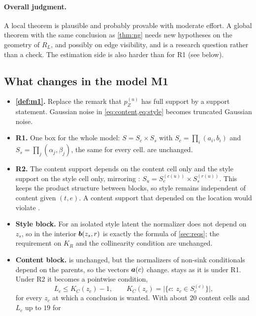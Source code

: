 \paragraph{Overall judgment.} A local theorem is plausible and probably provable with moderate effort. A
global theorem with the same conclusion as \cref{thm:ng} needs new hypotheses on the geometry of $R_L$, and
possibly on edge visibility, and is a research question rather than a check. The estimation side is also
harder than for R1 (see below).

\subsection{What changes in the model M1}
\label{app:support:m1}
\begin{itemize}[leftmargin=1.5em]
\item \textbf{\cref{def:m1}.} Replace the remark that $p^{(u)}_Z$ has full support by a support statement.
      Gaussian noise in \cref{eq:content,eq:style} becomes truncated Gaussian noise.
\item \textbf{R1.} One box for the whole model: $S=S_c\times S_s$ with $S_c=\prod_i(a_i,b_i)$ and
      $S_s=\prod_j(\alpha_j,\beta_j)$, the same for every cell.  are
      unchanged.
\item \textbf{R2.} The content support depends on the content cell only and the style support on the style
      cell only, mirroring :
      $S_u=S_c^{(c(u))}\times S_s^{(r(u))}$. This keeps the product structure between blocks, so style
      remains independent of content given $(t,e)$. A content support that depended on the location would
      violate .
\item \textbf{Style block.} For an isolated style latent the normalizer does not depend on $z_s$, so in the
      interior $\boldsymbol{b}(z_s,r)$ is exactly the formula of \cref{sec:reqs}; the requirement on $K_R$ and the
      collinearity condition are unchanged.
\item \textbf{Content block.}  is unchanged, but the normalizers of non-sink conditionals depend
      on the parents, so the vectors $\boldsymbol{a}(c)$ change.  stays as it is
      under R1. Under R2 it becomes a pointwise condition,
      \[
      L_c\le K_C(z_c)-1,\qquad K_C(z_c)=\bigl|\{c:\ z_c\in S_c^{(c)}\}\bigr|,
      \]
      for every $z_c$ at which a conclusion is wanted. With about $20$ content cells and $L_c$ up to $19$ for

\end{itemize}
